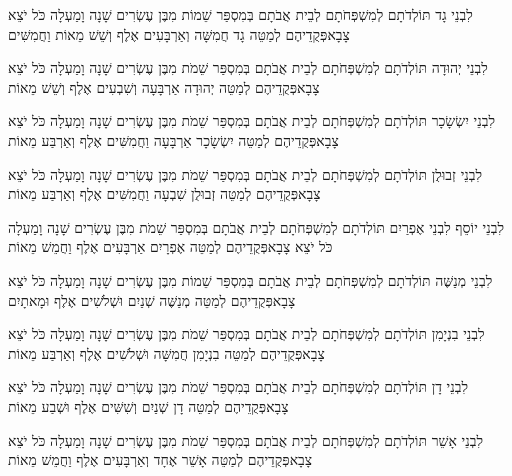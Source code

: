 \documentclass[../main/main.tex]{subfiles}
\begin{document}
\begin{multicols*}{\ncols}
לִבְנֵי גָד תּוֹלְדֹתָם לְמִשְׁפְּחֹתָם לְבֵית אֲבֹתָם בְּמִסְפַּר שֵׁמוֹת מִבֶּן עֶשְׂרִים שָׁנָה וָמַעְלָה כֹּל יֹצֵא צָבָא\PreVerseSpace{}פְּקֻדֵיהֶם לְמַטֵּה גָד חֲמִשָּׁה וְאַרְבָּעִים אֶלֶף וְשֵׁשׁ מֵאוֹת וַחֲמִשִּׁים\OpenSection{}\par
{}לִבְנֵי יְהוּדָה תּוֹלְדֹתָם לְמִשְׁפְּחֹתָם לְבֵית אֲבֹתָם בְּמִסְפַּר שֵׁמֹת מִבֶּן עֶשְׂרִים שָׁנָה וָמַעְלָה כֹּל יֹצֵא צָבָא\PreVerseSpace{}פְּקֻדֵיהֶם לְמַטֵּה יְהוּדָה אַרְבָּעָה וְשִׁבְעִים אֶלֶף וְשֵׁשׁ מֵאוֹת\OpenSection{}\par
{}לִבְנֵי יִשְׂשָׂכָר תּוֹלְדֹתָם לְמִשְׁפְּחֹתָם לְבֵית אֲבֹתָם בְּמִסְפַּר שֵׁמֹת מִבֶּן עֶשְׂרִים שָׁנָה וָמַעְלָה כֹּל יֹצֵא צָבָא\PreVerseSpace{}פְּקֻדֵיהֶם לְמַטֵּה יִשְׂשָׂכָר אַרְבָּעָה וַחֲמִשִּׁים אֶלֶף וְאַרְבַּע מֵאוֹת\OpenSection{}\par
{}לִבְנֵי זְבוּלֻן תּוֹלְדֹתָם לְמִשְׁפְּחֹתָם לְבֵית אֲבֹתָם בְּמִסְפַּר שֵׁמֹת מִבֶּן עֶשְׂרִים שָׁנָה וָמַעְלָה כֹּל יֹצֵא צָבָא\PreVerseSpace{}פְּקֻדֵיהֶם לְמַטֵּה זְבוּלֻן שִׁבְעָה וַחֲמִשִּׁים אֶלֶף וְאַרְבַּע מֵאוֹת\OpenSection{}\par
{}לִבְנֵי יוֹסֵף לִבְנֵי אֶפְרַיִם תּוֹלְדֹתָם לְמִשְׁפְּחֹתָם לְבֵית אֲבֹתָם בְּמִסְפַּר שֵׁמֹת מִבֶּן עֶשְׂרִים שָׁנָה וָמַעְלָה כֹּל יֹצֵא צָבָא\PreVerseSpace{}פְּקֻדֵיהֶם לְמַטֵּה אֶפְרָיִם אַרְבָּעִים אֶלֶף וַחֲמֵשׁ מֵאוֹת\OpenSection{}\par
{}לִבְנֵי מְנַשֶּׁה תּוֹלְדֹתָם לְמִשְׁפְּחֹתָם לְבֵית אֲבֹתָם בְּמִסְפַּר שֵׁמוֹת מִבֶּן עֶשְׂרִים שָׁנָה וָמַעְלָה כֹּל יֹצֵא צָבָא\PreVerseSpace{}פְּקֻדֵיהֶם לְמַטֵּה מְנַשֶּׁה שְׁנַיִם וּשְׁלֹשִׁים אֶלֶף וּמָאתָיִם\OpenSection{}\par
{}לִבְנֵי בִנְיָמִן תּוֹלְדֹתָם לְמִשְׁפְּחֹתָם לְבֵית אֲבֹתָם בְּמִסְפַּר שֵׁמֹת מִבֶּן עֶשְׂרִים שָׁנָה וָמַעְלָה כֹּל יֹצֵא צָבָא\PreVerseSpace{}פְּקֻדֵיהֶם לְמַטֵּה בִנְיָמִן חֲמִשָּׁה וּשְׁלֹשִׁים אֶלֶף וְאַרְבַּע מֵאוֹת\OpenSection{}\par
{}לִבְנֵי דָן תּוֹלְדֹתָם לְמִשְׁפְּחֹתָם לְבֵית אֲבֹתָם בְּמִסְפַּר שֵׁמֹת מִבֶּן עֶשְׂרִים שָׁנָה וָמַעְלָה כֹּל יֹצֵא צָבָא\PreVerseSpace{}פְּקֻדֵיהֶם לְמַטֵּה דָן שְׁנַיִם וְשִׁשִּׁים אֶלֶף וּשְׁבַע מֵאוֹת\OpenSection{}\par
{}לִבְנֵי אָשֵׁר תּוֹלְדֹתָם לְמִשְׁפְּחֹתָם לְבֵית אֲבֹתָם בְּמִסְפַּר שֵׁמֹת מִבֶּן עֶשְׂרִים שָׁנָה וָמַעְלָה כֹּל יֹצֵא צָבָא\PreVerseSpace{}פְּקֻדֵיהֶם לְמַטֵּה אָשֵׁר אֶחָד וְאַרְבָּעִים אֶלֶף וַחֲמֵשׁ מֵאוֹת\OpenSection{}\par

\end{multicols*}
\end{document}
